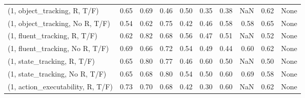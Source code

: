 \begin{table*}[h!]
\begin{adjustbox}{width=2\columnwidth,center}
\begin{tabular}{lrrr|rrr|rrr}
\midrule
(1, object\_tracking, R, T/F)         &                      0.65 &                  0.69 &                      0.46 &                          0.50 &                      0.35 &                          0.38 &                                    NaN &                               0.62 &                                  None \\
(1, object\_tracking, No R, T/F)      &                      0.54 &                  0.62 &                      0.75 &                          0.42 &                      0.46 &                          0.58 &                                   0.58 &                               0.65 &                                  None \\
(1, fluent\_tracking, R, T/F)         &                      0.62 &                  0.82 &                      0.68 &                          0.56 &                      0.47 &                          0.51 &                                    NaN &                               0.52 &                                  None \\
(1, fluent\_tracking, No R, T/F)      &                      0.69 &                  0.66 &                      0.72 &                          0.54 &                      0.49 &                          0.44 &                                   0.60 &                               0.62 &                                  None \\
(1, state\_tracking, R, T/F)          &                      0.65 &                  0.80 &                      0.77 &                          0.46 &                      0.60 &                          0.50 &                                    NaN &                               0.50 &                                  None \\
(1, state\_tracking, No R, T/F)       &                      0.65 &                  0.68 &                      0.80 &                          0.54 &                      0.50 &                          0.60 &                                   0.69 &                               0.58 &                                  None \\
(1, action\_executability, R, T/F)    &                      0.73 &                  0.70 &                      0.68 &                          0.42 &                      0.30 &                          0.60 &                                    NaN &                               0.62 &                                  None \\

\end{tabular}
\end{adjustbox}
\end{table*}
